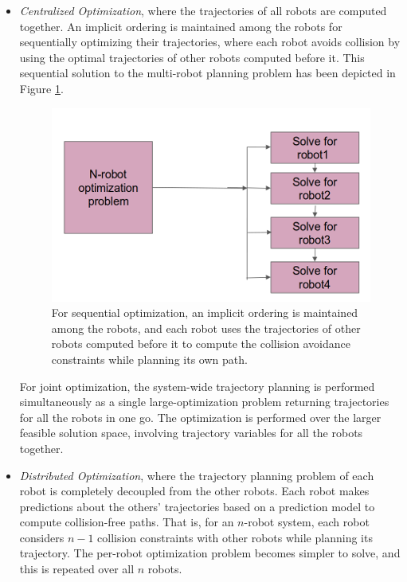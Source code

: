 \begin{itemize}
    \item \textit{Centralized Optimization}, where the trajectories of all robots are computed together. An implicit ordering is maintained among the robots for sequentially optimizing their trajectories, where each robot avoids collision by using the optimal trajectories of other robots computed before it. This sequential solution to the multi-robot planning problem has been depicted in Figure \ref{fig:intro_sequential_optimization}.

    \begin{figure}
    \centering
    \includegraphics[scale=0.5]{figures/intro/sequential-planning-pipeline.png}
    \caption[Sequential Planning Pipeline for Multi-Robot Systems]{For sequential optimization, an implicit ordering is maintained among the robots, and each robot uses the trajectories of other robots computed before it to compute the collision avoidance constraints while planning its own path. }
    \label{fig:intro_sequential_optimization}
\end{figure}

    For joint optimization, the system-wide trajectory planning is performed simultaneously as a single large-optimization problem returning trajectories for all the robots in one go. The optimization is performed over the larger feasible solution space, involving trajectory variables for all the robots together. 
    \item \textit{Distributed Optimization}, where the trajectory planning problem of each robot is completely decoupled from the other robots. Each robot makes predictions about the others' trajectories based on a prediction model to compute collision-free paths. That is, for an $n$-robot system, each robot considers $n-1$ collision constraints with other robots while planning its trajectory. The per-robot optimization problem becomes simpler to solve, and this is repeated over all $n$ robots.
\end{itemize}

